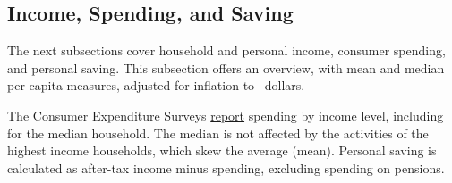\hypertarget{hhinc}{\label{hhinc}}
\subsection*{Income, Spending, and Saving}
\begin{minipage}{0.76\textwidth}
      
\small The next subsections cover household and personal income, consumer spending, and personal saving. This subsection offers an overview, with mean and median per capita measures, adjusted for inflation to \unskip \ dollars. 



The Consumer Expenditure Surveys \href{https://www.bls.gov/cex/tables.htm}{report} spending by income level, including for the median household. The median is not affected by the activities of the highest income households, which skew the average (mean). Personal saving is calculated as after-tax income minus spending, excluding spending on pensions.


\end{minipage}
\vspace{1mm}

